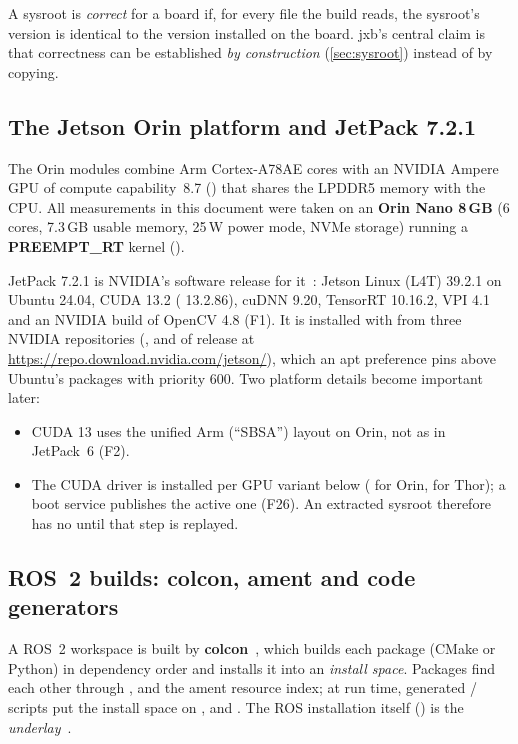 \documentclass[11pt,a4paper]{article}
\newcommand{\jxb}{\textsf{jxb}}
\newcommand{\finding}[1]{\textsf{\small F#1}}
\begin{document}
\begin{jxbnote}[Definition]
A sysroot is \emph{correct} for a board if, for every file the build reads, the sysroot's version is identical to the
version installed on the board. \jxb's central claim is that correctness can be established \emph{by construction}
(\cref{sec:sysroot}) instead of by copying.
\end{jxbnote}

\subsection{The Jetson Orin platform and JetPack 7.2.1}
The Orin modules combine Arm Cortex-A78AE cores with an NVIDIA Ampere GPU of compute capability~8.7
() that shares the LPDDR5 memory with the CPU. All measurements in this document were taken on an
\textbf{Orin Nano 8\,GB} (6 cores, 7.3\,GB usable memory, 25\,W power mode, NVMe storage) running a
\textbf{PREEMPT\_RT} kernel ().

JetPack 7.2.1 is NVIDIA's software release for it~\cite{nvidia-jetson}: Jetson Linux (L4T) 39.2.1 on Ubuntu 24.04,
CUDA 13.2 ( 13.2.86), cuDNN 9.20, TensorRT 10.16.2, VPI 4.1 and an NVIDIA build of OpenCV 4.8
(\finding{1}). It is installed with  from three NVIDIA repositories
(,  and  of release  at \url{https://repo.download.nvidia.com/jetson/}), which an apt preference pins above Ubuntu's
packages with priority 600. Two platform details become important later:
\begin{itemize}
  \item CUDA 13 uses the unified Arm (\enquote{SBSA}) layout  on Orin, not
         as in JetPack~6 (\finding{2}).
  \item The CUDA driver is installed per GPU variant below  ( for Orin,  for Thor); a boot
        service publishes the active one (\finding{26}). An extracted sysroot therefore has no 
        until that step is replayed.
\end{itemize}

\subsection{ROS~2 builds: colcon, ament and code generators}
A ROS~2 workspace is built by \textbf{colcon}~\cite{colcon}, which builds each package (CMake or Python) in
dependency order and installs it into an \emph{install space}. Packages find each other through
,  and the ament resource index; at run time, generated
/ scripts put the install space on ,  and
. The ROS installation itself () is the \emph{underlay}~\cite{ros2-docs}.
\end{document}
